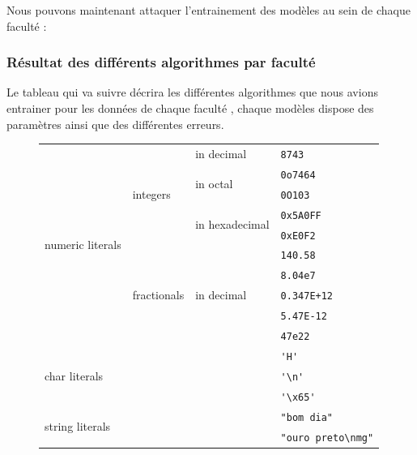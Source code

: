 Nous pouvons maintenant attaquer l'entrainement des modèles au sein de chaque faculté  :
\subsubsection{Résultat des différents algorithmes par faculté}
Le tableau qui va suivre décrira les différentes algorithmes que nous avions entrainer pour les données de chaque faculté , chaque modèles dispose des paramètres ainsi que des différentes erreurs.

\begin{figure}
	\centering
	\begin{tabular}{|l|l|l|l|}\hline
		\multirow{10}{*}{numeric literals} & \multirow{5}{*}{integers} & in decimal & \verb|8743| \\ \cline{3-4}
		& & \multirow{2}{*}{in octal} & \verb|0o7464| \\ \cline{4-4}
		& & & \verb|0O103| \\ \cline{3-4}
		& & \multirow{2}{*}{in hexadecimal} & \verb|0x5A0FF| \\ \cline{4-4}
		& & & \verb|0xE0F2| \\ \cline{2-4}
		& \multirow{5}{*}{fractionals} & \multirow{5}{*}{in decimal} & \verb|140.58| \\ \cline{4-4}
		& & & \verb|8.04e7| \\ \cline{4-4}
		& & & \verb|0.347E+12| \\ \cline{4-4}
		& & & \verb|5.47E-12| \\ \cline{4-4}
		& & & \verb|47e22| \\ \cline{1-4}
		\multicolumn{3}{|l|}{\multirow{3}{*}{char literals}} & \verb|'H'| \\ \cline{4-4}
		\multicolumn{3}{|l|}{} & \verb|'\n'| \\ \cline{4-4}          %
		\multicolumn{3}{|l|}{} & \verb|'\x65'| \\ \cline{1-4}        %
		\multicolumn{3}{|l|}{\multirow{2}{*}{string literals}} & \verb|"bom dia"| \\ \cline{4-4}
		\multicolumn{3}{|l|}{} & \verb|"ouro preto\nmg"| \\ \cline{1-4}          %
	\end{tabular}
\end{figure}

